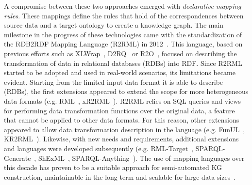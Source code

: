 A compromise between these two approaches emerged with \textit{declarative mapping rules}. 
These mappings define the rules that hold of the correspondences between source data and a target ontology to create a knowledge graph. 
The main milestone in the progress of these technologies came with the standardization of the RDB2RDF Mapping Language (R2RML) in 2012~\parencite{das2012r2rml}. 
This language, based on previous efforts such as XLWrap~\parencite{xlwrap}, D2RQ~\parencite{bizer2004d2rq} or R2O~\parencite{barrasa2004r2o}, focused on describing the transformation of data in relational databases (RDBs) into RDF. 
Since R2RML started to be adopted and used in real-world scenarios, its limitations became evident. 
Starting from the limited input data format it is able to describe (RDBs), the first extensions appeared to extend the scope for more heterogeneous data formats (e.g. RML~\parencite{Dimou2014rml}, xR2RML~\parencite{michel2015xr2rml}). 
R2RML relies on SQL queries and views for performing data transformation functions over the original data, a feature that cannot be applied to other data formats. 
For this reason, other extensions appeared to allow data transformation description in the language (e.g. FunUL~\parencite{junior2016funul}, KR2RML~\parencite{slepicka2015kr2rml}). 
Likewise, with new needs and requirements, additional extensions and languages were developed subsequently (e.g. RML-Target~\parencite{VanAssche2021LeveragingWebThings}, 
SPARQL-Generate~\parencite{Lefrancois2017sparqlgenerate}, 
ShExML~\parencite{Garcia-Gonzalez2020shexml}, 
SPARQL-Anything~\parencite{asprino2023sparql-anything}).
The use of mapping languages over this decade has proven to be a suitable approach for semi-automated KG construction, maintainable in the long term and scalable for large data sizes~\parencite{vidal2023knowledge,iglesias2023scaling,xiao2020virtual,iglesias2022empowering}.  


